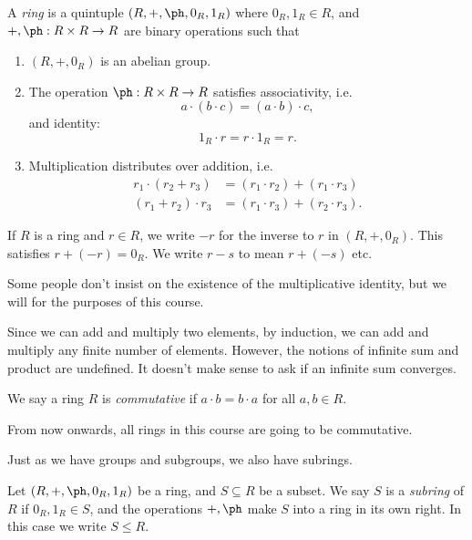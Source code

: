 \documentclass[a4paper]{article}
\begin{document}
\begin{defi}[Ring]
  A \emph{ring} is a quintuple $(R, +, \ph, 0_R, 1_R)$ where $0_R, 1_R \in R$, and $+, \ph: R \times R \to R$ are binary operations such that
  \begin{enumerate}
    \item $(R, +, 0_R)$ is an abelian group.
    \item The operation $\ph: R \times R \to R$ satisfies associativity, i.e.
      \[
        a\cdot (b\cdot c) = (a \cdot b)\cdot c,
      \]
      and identity:
      \[
        1_R \cdot r = r \cdot 1_R = r.
      \]
    \item Multiplication distributes over addition, i.e.
      \begin{align*}
        r_1 \cdot (r_2 + r_3) &= (r_1 \cdot r_2) + (r_1 \cdot r_3)\\
        (r_1 + r_2) \cdot r_3 &= (r_1 \cdot r_3) + (r_2 \cdot r_3).
      \end{align*}
  \end{enumerate}
\end{defi}

\begin{notation}
  If $R$ is a ring and $r \in R$, we write $-r$ for the inverse to $r$ in $(R, +, 0_R)$. This satisfies $r + (-r) = 0_R$. We write $r - s$ to mean $r + (-s)$ etc.
\end{notation}
Some people don't insist on the existence of the multiplicative identity, but we will for the purposes of this course.

Since we can add and multiply two elements, by induction, we can add and multiply any finite number of elements. However, the notions of infinite sum and product are undefined. It doesn't make sense to ask if an infinite sum converges.

\begin{defi}
  We say a ring $R$ is \emph{commutative} if $a \cdot b = b \cdot a$ for all $a, b \in R$.
\end{defi}
From now onwards, all rings in this course are going to be commutative.

Just as we have groups and subgroups, we also have subrings.
\begin{defi}[Subring]
  Let $(R, +, \ph, 0_R, 1_R)$ be a ring, and $S \subseteq R$ be a subset. We say $S$ is a \emph{subring} of $R$ if $0_R, 1_R \in S$, and the operations $+, \ph$ make $S$ into a ring in its own right. In this case we write $S \leq R$.
\end{defi}
\end{document}
